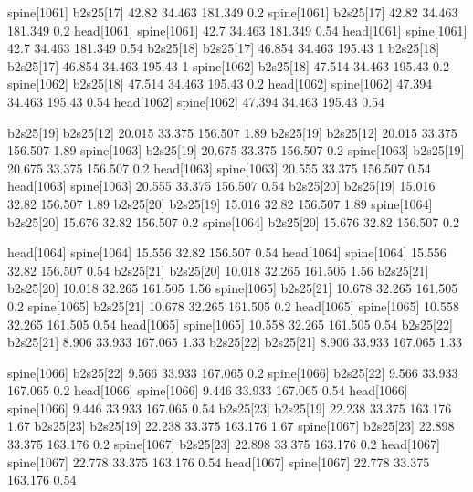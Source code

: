 spine[1061]    b2s25[17]    42.82    34.463    181.349    0.2
spine[1061]    b2s25[17]    42.82    34.463    181.349    0.2
head[1061]    spine[1061]    42.7    34.463    181.349    0.54
head[1061]    spine[1061]    42.7    34.463    181.349    0.54
b2s25[18]    b2s25[17]    46.854    34.463    195.43    1
b2s25[18]    b2s25[17]    46.854    34.463    195.43    1
spine[1062]    b2s25[18]    47.514    34.463    195.43    0.2
spine[1062]    b2s25[18]    47.514    34.463    195.43    0.2
head[1062]    spine[1062]    47.394    34.463    195.43    0.54
head[1062]    spine[1062]    47.394    34.463    195.43    0.54


b2s25[19]    b2s25[12]    20.015    33.375    156.507    1.89
b2s25[19]    b2s25[12]    20.015    33.375    156.507    1.89
spine[1063]    b2s25[19]    20.675    33.375    156.507    0.2
spine[1063]    b2s25[19]    20.675    33.375    156.507    0.2
head[1063]    spine[1063]    20.555    33.375    156.507    0.54
head[1063]    spine[1063]    20.555    33.375    156.507    0.54
b2s25[20]    b2s25[19]    15.016    32.82    156.507    1.89
b2s25[20]    b2s25[19]    15.016    32.82    156.507    1.89
spine[1064]    b2s25[20]    15.676    32.82    156.507    0.2
spine[1064]    b2s25[20]    15.676    32.82    156.507    0.2


head[1064]    spine[1064]    15.556    32.82    156.507    0.54
head[1064]    spine[1064]    15.556    32.82    156.507    0.54
b2s25[21]    b2s25[20]    10.018    32.265    161.505    1.56
b2s25[21]    b2s25[20]    10.018    32.265    161.505    1.56
spine[1065]    b2s25[21]    10.678    32.265    161.505    0.2
spine[1065]    b2s25[21]    10.678    32.265    161.505    0.2
head[1065]    spine[1065]    10.558    32.265    161.505    0.54
head[1065]    spine[1065]    10.558    32.265    161.505    0.54
b2s25[22]    b2s25[21]    8.906    33.933    167.065    1.33
b2s25[22]    b2s25[21]    8.906    33.933    167.065    1.33


spine[1066]    b2s25[22]    9.566    33.933    167.065    0.2
spine[1066]    b2s25[22]    9.566    33.933    167.065    0.2
head[1066]    spine[1066]    9.446    33.933    167.065    0.54
head[1066]    spine[1066]    9.446    33.933    167.065    0.54
b2s25[23]    b2s25[19]    22.238    33.375    163.176    1.67
b2s25[23]    b2s25[19]    22.238    33.375    163.176    1.67
spine[1067]    b2s25[23]    22.898    33.375    163.176    0.2
spine[1067]    b2s25[23]    22.898    33.375    163.176    0.2
head[1067]    spine[1067]    22.778    33.375    163.176    0.54
head[1067]    spine[1067]    22.778    33.375    163.176    0.54


